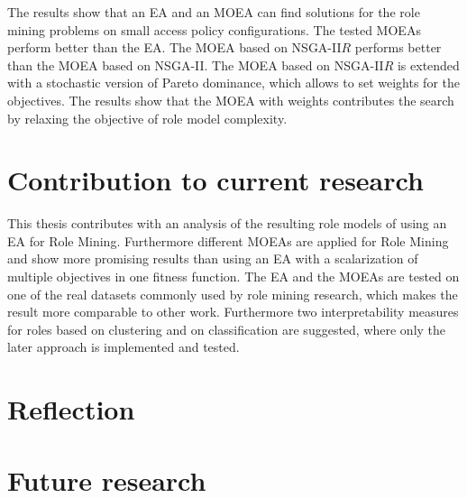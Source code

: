 The results show that an EA and an MOEA can find solutions for the role mining problems on small access policy configurations. The tested MOEAs perform better than the EA. The MOEA based on NSGA-II$R$\cite{Fortin:2013} performs better than the MOEA based on NSGA-II\cite{Deb}. The MOEA based on NSGA-II$R$ is extended with a stochastic version of Pareto dominance, which allows to set weights for the objectives\cite{clune2013evolutionary}. The results show that the MOEA with weights contributes the search by relaxing the objective of role model complexity.

\section{Contribution to current research}
This thesis contributes with an analysis of the resulting role models of using an EA for Role Mining. Furthermore different MOEAs are applied for Role Mining and show more promising results than using an EA with a scalarization of multiple objectives in one fitness function. The EA and the MOEAs are tested on one of the real datasets commonly used by role mining research, which makes the result more comparable to other work. Furthermore two interpretability measures for roles based on clustering and on classification are suggested, where only the later approach is implemented and tested.

\section{Reflection}

\section{Future research}

